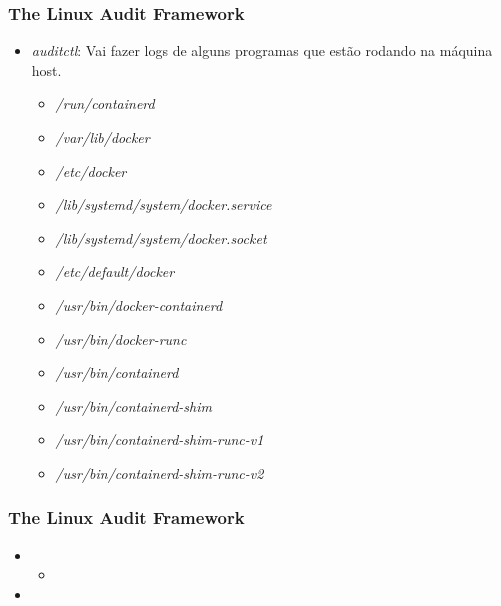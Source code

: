 \begin{frame}
	\frametitle{The Linux Audit Framework}
	\begin{itemize}
		\item \textit{auditctl}: Vai fazer logs de alguns programas que estão rodando na máquina host.
			\begin{itemize}
				\item \textit{/run/containerd}
				\item \textit{/var/lib/docker}
				\item \textit{/etc/docker}
				\item \textit{/lib/systemd/system/docker.service}
				\item \textit{/lib/systemd/system/docker.socket}
				\item \textit{/etc/default/docker}
				\item \textit{/usr/bin/docker-containerd}
				\item \textit{/usr/bin/docker-runc}
				\item \textit{/usr/bin/containerd}
				\item \textit{/usr/bin/containerd-shim}
				\item \textit{/usr/bin/containerd-shim-runc-v1}
				\item \textit{/usr/bin/containerd-shim-runc-v2}
			\end{itemize}
	\end{itemize}
\end{frame}

\begin{frame}
	\frametitle{The Linux Audit Framework}
	\begin{itemize}
		\item {}
			\begin{itemize}
				\item {}
			\end{itemize}
		\item {}
	\end{itemize}
\end{frame}

